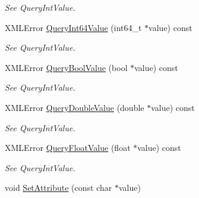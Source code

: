 \begin{DoxyCompactItemize}
\begin{DoxyCompactList}\small\item\em See Query\+Int\+Value. \end{DoxyCompactList}\item 
\hypertarget{classtinyxml2_1_1_x_m_l_attribute_a553d419c598e79b2858f65c8a2ba598c}{}X\+M\+L\+Error \hyperlink{classtinyxml2_1_1_x_m_l_attribute_a553d419c598e79b2858f65c8a2ba598c}{Query\+Int64\+Value} (int64\+\_\+t $\ast$value) const \label{classtinyxml2_1_1_x_m_l_attribute_a553d419c598e79b2858f65c8a2ba598c}

\begin{DoxyCompactList}\small\item\em See Query\+Int\+Value. \end{DoxyCompactList}\item 
\hypertarget{classtinyxml2_1_1_x_m_l_attribute_a9e9b94369f182df72aaac9acd04afead}{}X\+M\+L\+Error \hyperlink{classtinyxml2_1_1_x_m_l_attribute_a9e9b94369f182df72aaac9acd04afead}{Query\+Bool\+Value} (bool $\ast$value) const \label{classtinyxml2_1_1_x_m_l_attribute_a9e9b94369f182df72aaac9acd04afead}

\begin{DoxyCompactList}\small\item\em See Query\+Int\+Value. \end{DoxyCompactList}\item 
\hypertarget{classtinyxml2_1_1_x_m_l_attribute_a0872c05edea2a7cde4bd96c1e9cb2fc4}{}X\+M\+L\+Error \hyperlink{classtinyxml2_1_1_x_m_l_attribute_a0872c05edea2a7cde4bd96c1e9cb2fc4}{Query\+Double\+Value} (double $\ast$value) const \label{classtinyxml2_1_1_x_m_l_attribute_a0872c05edea2a7cde4bd96c1e9cb2fc4}

\begin{DoxyCompactList}\small\item\em See Query\+Int\+Value. \end{DoxyCompactList}\item 
\hypertarget{classtinyxml2_1_1_x_m_l_attribute_afb254627c296d1d70b755397d32fece8}{}X\+M\+L\+Error \hyperlink{classtinyxml2_1_1_x_m_l_attribute_afb254627c296d1d70b755397d32fece8}{Query\+Float\+Value} (float $\ast$value) const \label{classtinyxml2_1_1_x_m_l_attribute_afb254627c296d1d70b755397d32fece8}

\begin{DoxyCompactList}\small\item\em See Query\+Int\+Value. \end{DoxyCompactList}\item 
\hypertarget{classtinyxml2_1_1_x_m_l_attribute_a406d2c4a13c7af99a65edb59dd9f7581}{}void \hyperlink{classtinyxml2_1_1_x_m_l_attribute_a406d2c4a13c7af99a65edb59dd9f7581}{Set\+Attribute} (const char $\ast$value)\label{classtinyxml2_1_1_x_m_l_attribute_a406d2c4a13c7af99a65edb59dd9f7581}


\end{DoxyCompactItemize}
